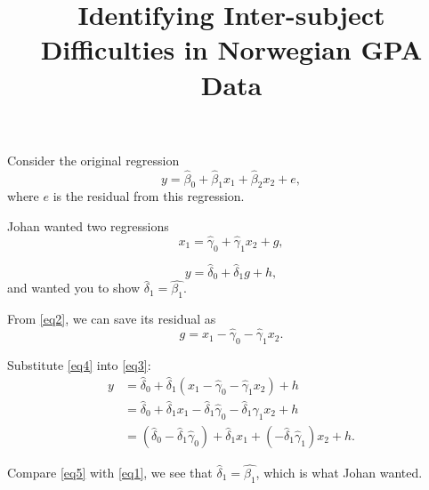 \documentclass[
    a4paper,                %
    11pt,                   %
    stu,                    %
    donotrepeattitle,       %
    floatsintext,           %
    biblatex,               %
    colorlinks=true,        %
    linkcolor=red,          %
    anchorcolor=black,      %
    citecolor=blue,         %
    urlcolor=blue,          %
    bookmarks=true,         %
    bookmarksopen=false,    %
    bookmarksnumbered=true, %
    dvipsnames              %
]{apa7}
\title{Identifying Inter-subject Difficulties in Norwegian GPA Data}
\begin{document}
\maketitle

Consider the original regression
\begin{equation}\label{eq1}
    y = \hat{\beta}_0 + \hat{\beta}_1 x_1 + \hat{\beta}_2 x_2 + e,
\end{equation}
where $e$ is the residual from this regression.

Johan wanted two regressions
\begin{equation}\label{eq2}
    x_1 = \hat{\gamma}_0 + \hat{\gamma}_1 x_2 + g,
\end{equation}

\begin{equation}\label{eq3}
    y = \hat{\delta}_0 + \hat{\delta}_1 g + h,
\end{equation}
and wanted you to show $\hat{\delta}_1 = \hat{\beta_1}$.

From \cref{eq2}, we can save its residual as
\begin{equation}\label{eq4}
    g = x_1 - \hat{\gamma}_0 - \hat{\gamma}_1 x_2.
\end{equation}

Substitute \cref{eq4} into \cref{eq3}:
\begin{equation}\label{eq5}
    \begin{aligned}
        y &= \hat{\delta}_0 + \hat{\delta}_1 (x_1 - \hat{\gamma}_0 - \hat{\gamma}_1  x_2) + h \\
        &= \hat{\delta}_0 + \hat{\delta}_1 x_1 - \hat{\delta}_1 \hat{\gamma}_0 - \hat{\delta}_1 \hat{\gamma}_1 x_2 + h \\
        &= \left( \hat{\delta}_0 - \hat{\delta}_1 \hat{\gamma}_0 \right) + \hat{\delta}_1 x_1 + \left( - \hat{\delta}_1 \hat{\gamma}_1 \right) x_2 + h.
    \end{aligned}
\end{equation}

Compare \cref{eq5} with \cref{eq1}, we see that $\hat{\delta}_1 = \hat{\beta_1}$, which is what Johan wanted.
\end{document}
